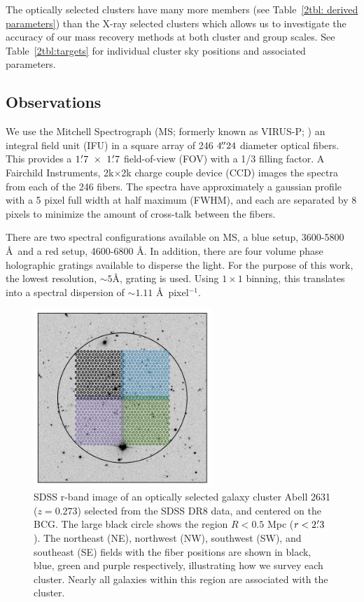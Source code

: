 The optically selected clusters have many more members (see Table~\ref{2tbl: derived parameters}) than the X-ray selected clusters which allows us to investigate the accuracy of our mass recovery methods at both cluster and group scales. See Table~\ref{2tbl:targets} for individual cluster sky positions and associated parameters. 

\subsection{Observations} 
We use the Mitchell Spectrograph (MS; formerly known as VIRUS-P; \citealt{Hill2008a}) an integral field unit (IFU) in a square array of 246 $4\mbox{\ensuremath{.\!\!^{\prime\prime}}}24$ diameter optical fibers. This provides a $1\mbox{\ensuremath{.\mkern-4mu^\prime}}7~\times~1\mbox{\ensuremath{.\mkern-4mu^\prime}}7$ field-of-view (FOV) with a 1/3 filling factor. A Fairchild Instruments, 2k$\times$2k charge couple device (CCD) images the spectra from each of the 246 fibers. The spectra have approximately a gaussian profile with a 5 pixel full width at half maximum (FWHM), and each are separated by 8 pixels to minimize the amount of cross-talk between the fibers. 

There are two spectral configurations available on MS, a blue setup, 3600-5800 \AA\ and a red setup, 4600-6800 \AA. In addition, there are four volume phase holographic gratings available to disperse the light. For the purpose of this work, the lowest resolution, $\sim5$\AA, grating is used. Using $1\times1$ binning, this translates into a spectral dispersion of $\sim1.11$ \AA\ pixel$^{-1}$. 

\begin{figure}[t]
	\begin{center}
		\includegraphics[width=0.6\textwidth]{./figures2/pointing.pdf} 
	\end{center}
	\caption[Basic properties of the ten galaxy clusters targeted with the MS.]{SDSS r-band image of an optically selected galaxy cluster Abell 2631 ($z=0.273$) selected from the SDSS DR8 data, and centered on the BCG. The large black circle shows the region $R<0.5$ Mpc ($r<2\mbox{\ensuremath{.\mkern-4mu^\prime}}3$). The northeast (NE), northwest (NW), southwest (SW), and southeast (SE) fields with the fiber positions are shown in black, blue, green and purple respectively, illustrating how we survey each cluster. Nearly all galaxies within this region are associated with the cluster.}
	\label{2fig:tiles} 
\end{figure}

